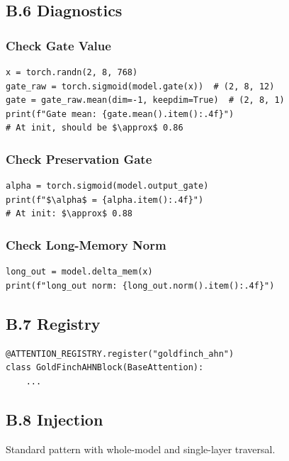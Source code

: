 \subsection{B.6 Diagnostics}

\subsubsection{Check Gate Value}

\begin{lstlisting}
x = torch.randn(2, 8, 768)
gate_raw = torch.sigmoid(model.gate(x))  # (2, 8, 12)
gate = gate_raw.mean(dim=-1, keepdim=True)  # (2, 8, 1)
print(f"Gate mean: {gate.mean().item():.4f}")
# At init, should be $\approx$ 0.86
\end{lstlisting}

\subsubsection{Check Preservation Gate}

\begin{lstlisting}
alpha = torch.sigmoid(model.output_gate)
print(f"$\alpha$ = {alpha.item():.4f}")
# At init: $\approx$ 0.88
\end{lstlisting}

\subsubsection{Check Long-Memory Norm}

\begin{lstlisting}
long_out = model.delta_mem(x)
print(f"long_out norm: {long_out.norm().item():.4f}")
\end{lstlisting}

\subsection{B.7 Registry}

\begin{lstlisting}
@ATTENTION_REGISTRY.register("goldfinch_ahn")
class GoldFinchAHNBlock(BaseAttention):
    ...
\end{lstlisting}

\subsection{B.8 Injection}

Standard pattern with whole-model and single-layer traversal.




